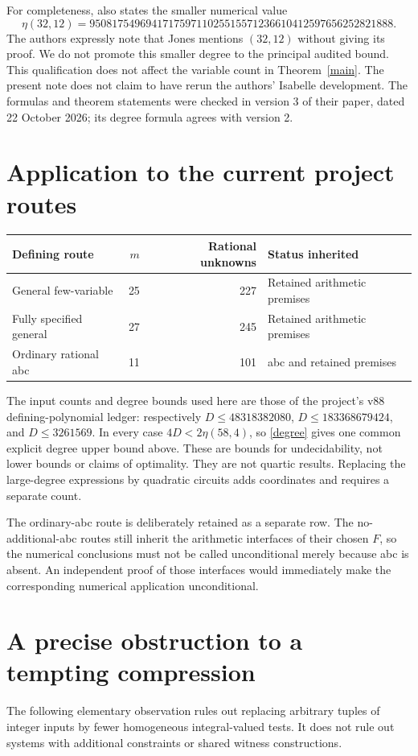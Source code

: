 \documentclass[11pt,a4paper]{article}
\begin{document}
For completeness, \cite{BDHMS} also states the smaller numerical value
\[
 \eta(32,12)=950817549694171759711025515571236610412597656252821888.
\]
The authors expressly note that Jones mentions $(32,12)$ without giving its
proof. We do not promote this smaller degree to the principal audited bound.
This qualification does not affect the variable count in Theorem~\ref{main}.
The present note does not claim to have rerun the authors' Isabelle development.
The formulas and theorem statements were checked in version 3 of their paper,
dated 22 October 2026; its degree formula agrees with version 2.

\section{Application to the current project routes}
\begin{center}
\begin{tabular}{lrrl}\toprule
Defining route & $m$ & Rational unknowns & Status inherited\\\midrule
General few-variable &25&227&Retained arithmetic premises\\
Fully specified general &27&245&Retained arithmetic premises\\
Ordinary rational abc &11&101&abc and retained premises\\\bottomrule
\end{tabular}
\end{center}
The input counts and degree bounds used here are those of the project's
v88 defining-polynomial ledger: respectively $D\le48318382080$,
$D\le183368679424$, and $D\le3261569$. In every case $4D<2\eta(58,4)$,
so \eqref{degree} gives one common explicit degree upper bound above.
These are bounds for undecidability, not lower bounds or claims of optimality.
They are not quartic results. Replacing the large-degree expressions by
quadratic circuits adds coordinates and requires a separate count.

The ordinary-abc route is deliberately retained as a separate row. The
no-additional-abc routes still inherit the arithmetic interfaces of their
chosen $F$, so the numerical conclusions must not be called unconditional
merely because abc is absent. An independent proof of those interfaces
would immediately make the corresponding numerical application unconditional.

\section{A precise obstruction to a tempting compression}
The following elementary observation rules out replacing arbitrary tuples
of integer inputs by fewer homogeneous integral-valued tests. It does not
rule out systems with additional constraints or shared witness constructions.
\end{document}
